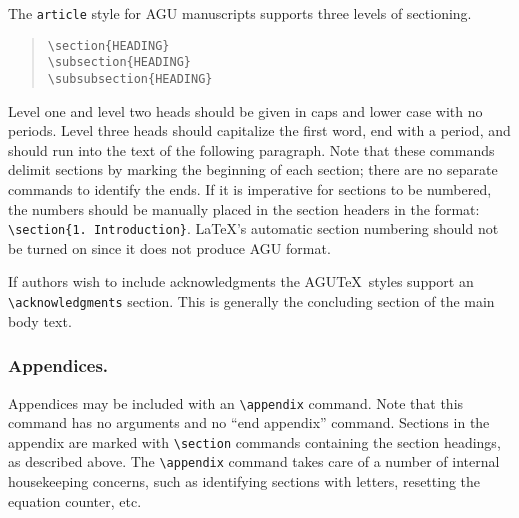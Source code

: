 The {\tt article} style for AGU manuscripts 
supports three levels of sectioning.
\begin{quote}
\verb"\section{HEADING}"\\[.5ex]
\verb"\subsection{HEADING}"\\[.5ex]
\verb"\subsubsection{HEADING}"
\end{quote}
Level one and level two heads should be given in caps and lower case 
with no periods.  Level three heads should capitalize the first word, 
end with a period, and should run into the text of the following 
paragraph.  Note that these commands delimit sections by marking the 
beginning of each section; there are no separate commands to identify 
the ends.  If it is imperative for sections to be numbered, the numbers
should be manually placed in the section headers in the format:  
\verb"\section{1. Introduction}".  \LaTeX's automatic section numbering 
should not be turned on since it does not produce AGU format.

If authors wish to include acknowledgments the AGU\TeX\ styles support an 
\verb"\acknowledgments" section.  This is generally the concluding section 
of the main body text.

\subsubsection{Appendices.}Appendices may be included with an 
\verb"\appendix" command.  Note that this command has no arguments 
and no ``end appendix'' command.  Sections in the appendix are marked 
with \verb"\section" commands containing the section headings, as 
described above.  The \verb"\appendix" command takes care of a number 
of internal housekeeping concerns, such as identifying sections with 
letters, resetting the equation counter, etc.

